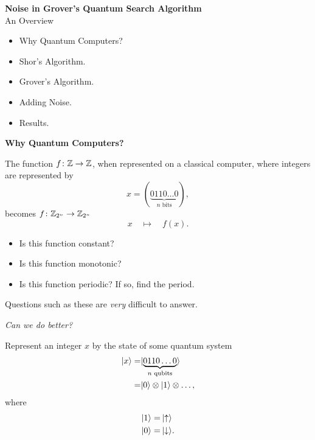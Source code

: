\documentclass{slides}
\begin{document}
\begin{center}
\textbf{Noise in Grover's Quantum Search Algorithm}\\
\bigskip
\bigskip
{An Overview}
\end{center}

\begin{itemize}
\item Why Quantum Computers?
\item Shor's Algorithm.
\item Grover's Algorithm.
\item Adding Noise.
\item Results.
\end{itemize}

\pagebreak


\begin{center}
\textbf{Why Quantum Computers?}
\end{center}

The function $f\colon{\mathbb{Z}}\to{\mathbb{Z}}$,
when represented on a classical computer, where
integers are represented by
\begin{equation*}
x=(\underbrace{0110\ldots0}_{n\text{ bits}}),%
\end{equation*}
becomes $f\colon{\mathbb{Z}}_{2^n}\to{\mathbb{Z}}_{2^n}$
\begin{equation*}
x\quad\mapsto\quad f(x).
\end{equation*}
\begin{itemize}
\item Is this function constant?
\item Is this function monotonic?
\item Is this function periodic?  If so, find the period.
\end{itemize}
Questions such as these are \emph{very} difficult to answer.

\begin{center}
{\sl Can we do better?}
\end{center}

\pagebreak

Represent an integer $x$ by the state of some quantum system
\begin{equation*}
\begin{split}
{|{x}\rangle}=&{|{\underbrace{0110\ldots0}_{n\text{ qubits}}}\rangle}\\
 =& {|{0}\rangle}\otimes
             {|{1}\rangle}\otimes\ldots,
\end{split}
\end{equation*}
where
\begin{equation*}
\begin{split}
    {|{1}\rangle} =& \,{|{\uparrow}\rangle}\\
    {|{0}\rangle} =& \,{|{\downarrow}\rangle}.
\end{split}
\end{equation*}
\end{document}
